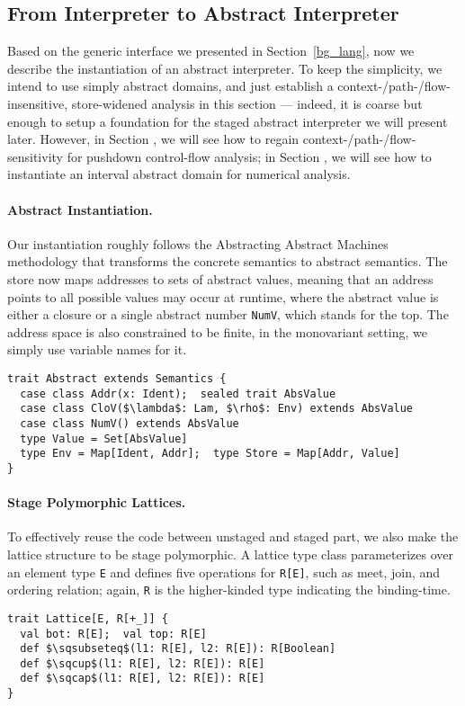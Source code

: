 \subsection{From Interpreter to Abstract Interpreter}

Based on the generic interface we presented in Section~\ref{bg_lang}, now we describe the instantiation of an
abstract interpreter.
To keep the simplicity, we intend to use simply abstract domains, and just establish a 
context-/path-/flow-insensitive, store-widened analysis in this section --- indeed, it is coarse 
but enough to setup a foundation for the staged abstract interpreter we will present later.
However, in Section , we will see how to regain context-/path-/flow-sensitivity 
for pushdown control-flow analysis; in Section , we will see how to instantiate 
an interval abstract domain for numerical analysis.

\paragraph{Abstract Instantiation.}
Our instantiation roughly follows the Abstracting Abstract Machines methodology 
\cite{DBLP:conf/icfp/HornM10, DBLP:journals/jfp/HornM12} that transforms the concrete semantics 
to abstract semantics. The store now maps addresses to sets of abstract values, meaning that an address points
to all possible values may occur at runtime, where the abstract value is either a closure or 
a single abstract number \texttt{NumV}, which stands for the top. The address space is also
constrained to be finite, in the monovariant setting, we simply use variable names for it.

\begin{lstlisting}
trait Abstract extends Semantics {
  case class Addr(x: Ident);  sealed trait AbsValue
  case class CloV($\lambda$: Lam, $\rho$: Env) extends AbsValue
  case class NumV() extends AbsValue
  type Value = Set[AbsValue]
  type Env = Map[Ident, Addr];  type Store = Map[Addr, Value]
}
\end{lstlisting}

\paragraph{Stage Polymorphic Lattices.}
To effectively reuse the code between unstaged and staged part, we also make the lattice structure to
be stage polymorphic. A lattice type class parameterizes over an element type \texttt{E} and defines
five operations for \texttt{R[E]}, such as meet, join, and ordering relation; again, \texttt{R} 
is the higher-kinded type indicating the binding-time.
\begin{lstlisting}
trait Lattice[E, R[+_]] {
  val bot: R[E];  val top: R[E]
  def $\sqsubseteq$(l1: R[E], l2: R[E]): R[Boolean]
  def $\sqcup$(l1: R[E], l2: R[E]): R[E]
  def $\sqcap$(l1: R[E], l2: R[E]): R[E]
}
\end{lstlisting}

